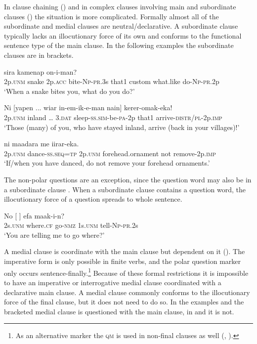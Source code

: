 In clause chaining () and in complex clauses involving main and subordinate clauses () the situation is more complicated. Formally almost all of the subordinate and medial clauses are neutral/declarative. A subordinate clause typically lacks an illocutionary force of its own \citep[32]{Cristofaro2003} and conforms to the functional sentence type of the main clause. In the following examples the subordinate clauses are in brackets.

\ea%
\label{ex:8:x1357}
  sira  kamenap on-i-man?\\
2p.\textsc{unm}  snake  2p.\textsc{acc}  bite-\textsc{Np}-\textsc{pr}.3s  that1  custom  what.like do-\textsc{Np}-\textsc{pr}.2p\\
\glt `When a snake bites you, what do you do?'
\z


\ea%
\label{ex:8:x1897}
\gll Ni  [yapen  ...  wiar  in-em-ik-e-man  nain] kerer-omak-eka!\\
2p.\textsc{unm}  inland  {\dots}  3.\textsc{dat}  sleep-\textsc{ss}.\textsc{sim}-be-\textsc{pa}-2p  that1 arrive-\textsc{distr/pl}-2p.\textsc{imp}\\
\glt `Those (many) of you, who have stayed inland, arrive (back in your villages)!'
\z


\ea%
\label{ex:8:x1898}
\gll [Ni  uf-ep-na]  ni  maadara  me iirar-eka.\\
2p.\textsc{unm} dance-\textsc{ss}.\textsc{seq}=\textsc{tp}  2p.\textsc{unm}  forehead.ornament  not remove-2p.\textsc{imp}\\
\glt `If/when you have danced, do not remove your forehead ornaments.'
\z

The non-polar questions are an exception, since the question word may also be in a subordinate clause . When a subordinate clause contains a question word, the illocutionary force of a question spreads to whole sentence. 

\ea%
\label{ex:8:x1362}
\gll No  [  ]  efa  maak-i-n?\\
2s.\textsc{unm}  where.\textsc{cf}  go-\textsc{nmz}  1s.\textsc{unm}  tell-\textsc{Np}-\textsc{pr}.2s\\
\glt `You are telling me to go where?'
\z

A medial clause is coordinate with the main clause but dependent on it (). The imperative form is only possible in finite verbs, and the polar question marker only occurs sentence-finally.\footnote{As an alternative marker the \textsc{qm} is used in non-final clauses as well (, ).} Because of these formal restrictions it is impossible to have an imperative or interrogative medial clause coordinated with a declarative main clause. A medial clause commonly conforms to the illocutionary force of the final clause, but it does not need to do so. In the examples  and  the bracketed medial clause is questioned with the main clause, in  and  it is not.  

